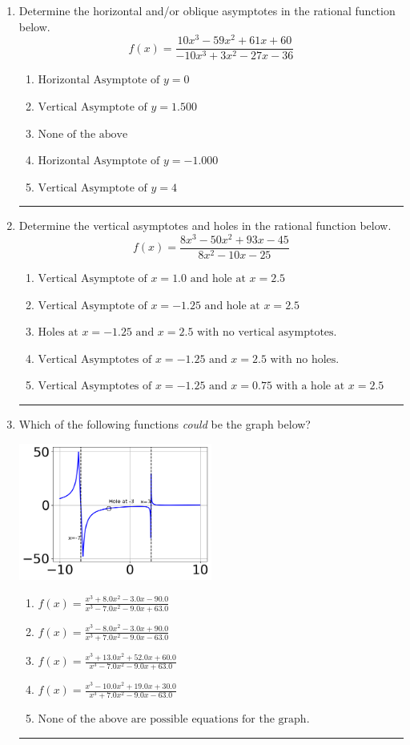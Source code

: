 \documentclass[14pt]{extbook}
\newcommand{\litem}[1]{\item#1\hspace*{-1cm}\rule{\textwidth}{0.4pt}}
\begin{document}
\begin{enumerate}
\litem{
Determine the horizontal and/or oblique asymptotes in the rational function below.\[ f(x) = \frac{10x^{3} -59 x^{2} +61 x + 60}{-10x^{3} +3 x^{2} -27 x -36} \]\begin{enumerate}[label=\Alph*.]
\item \( \text{Horizontal Asymptote of } y = 0  \)
\item \( \text{Vertical Asymptote of } y = 1.500  \)
\item \( \text{None of the above} \)
\item \( \text{Horizontal Asymptote of } y = -1.000  \)
\item \( \text{Vertical Asymptote of } y = 4  \)

\end{enumerate} }
\litem{
Determine the vertical asymptotes and holes in the rational function below.\[ f(x) = \frac{8x^{3} -50 x^{2} +93 x -45}{8x^{2} -10 x -25} \]\begin{enumerate}[label=\Alph*.]
\item \( \text{Vertical Asymptote of } x = 1.0 \text{ and hole at } x = 2.5 \)
\item \( \text{Vertical Asymptote of } x = -1.25 \text{ and hole at } x = 2.5 \)
\item \( \text{Holes at } x = -1.25 \text{ and } x = 2.5 \text{ with no vertical asymptotes.} \)
\item \( \text{Vertical Asymptotes of } x = -1.25 \text{ and } x = 2.5 \text{ with no holes.} \)
\item \( \text{Vertical Asymptotes of } x = -1.25 \text{ and } x = 0.75 \text{ with a hole at } x = 2.5 \)

\end{enumerate} }
\litem{
Which of the following functions \textit{could} be the graph below?
\begin{center}
    \includegraphics[width=0.5\textwidth]{../Figures/identifyGraphOfRationalFunctionCopyA.png}
\end{center}
\begin{enumerate}[label=\Alph*.]
\item \( f(x)=\frac{x^{3} +8.0 x^{2} -3.0 x -90.0}{x^{3} -7.0 x^{2} -9.0 x + 63.0} \)
\item \( f(x)=\frac{x^{3} -8.0 x^{2} -3.0 x + 90.0}{x^{3} +7.0 x^{2} -9.0 x -63.0} \)
\item \( f(x)=\frac{x^{3} +13.0 x^{2} +52.0 x + 60.0}{x^{3} -7.0 x^{2} -9.0 x + 63.0} \)
\item \( f(x)=\frac{x^{3} -10.0 x^{2} +19.0 x + 30.0}{x^{3} +7.0 x^{2} -9.0 x -63.0} \)
\item \( \text{None of the above are possible equations for the graph.} \)


\end{enumerate}}
\end{enumerate}
\end{document}
